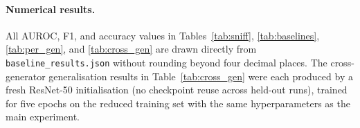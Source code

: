 \paragraph{Numerical results.}
All AUROC, F1, and accuracy values in Tables~\ref{tab:sniff},
\ref{tab:baselines}, \ref{tab:per_gen}, and \ref{tab:cross_gen} are
drawn directly from \texttt{baseline\_results.json} without rounding
beyond four decimal places.
The cross-generator generalisation results in Table~\ref{tab:cross_gen}
were each produced by a fresh ResNet-50 initialisation (no checkpoint
reuse across held-out runs), trained for five epochs on the reduced
training set with the same hyperparameters as the main experiment.
